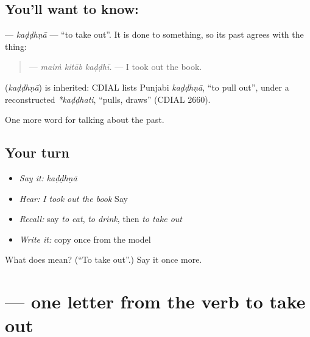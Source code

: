 \subsection*{You'll want to know: }
\textbf{} — \emph{kaḍḍhṇā} — \textquotedblleft{}to take out\textquotedblright{}. It is done to something, so its past agrees with the thing:

\begin{quote}
\textbf{  } — \emph{maiṁ kitāb kaḍḍhī.} — I took out the book.
\end{quote}

\begin{cousinweb}
\textbf{} (\emph{kaḍḍhṇā}) is inherited: CDIAL lists Punjabi \emph{kaḍḍhṇā}, \textquotedblleft{}to pull out\textquotedblright{}, under a reconstructed \emph{*kaḍḍhati}, \textquotedblleft{}pulls, draws\textquotedblright{} (CDIAL 2660).
\end{cousinweb}

\begin{grammarlens}[title={What you've built}]
One more word for talking about the past.
\end{grammarlens}

\subsection*{Your turn}
\begin{itemize}
\raggedright
  \item \emph{Say it:} \emph{kaḍḍhṇā}
  \item \emph{Hear:} \emph{I took out the book} Say \textbf{  }
  \item \emph{Recall:} say \emph{to eat}, \emph{to drink}, then \emph{to take out}
  \item \emph{Write it:} copy \textbf{} once from the model
\end{itemize}

\begin{tcolorbox}[breakable,colback=teal!4,colframe=teal!35!black,title={Before you move on}]
What does \textbf{} mean? (\textquotedblleft{}To take out\textquotedblright{}.) Say it once more.
\end{tcolorbox}
\section[\texorpdfstring{\pa{ਢ} (ḍha)}{ਢ (ḍha)}]{ — one letter from the verb to take out}

